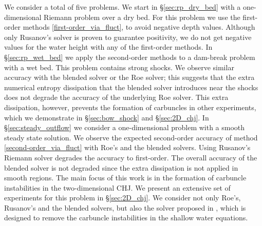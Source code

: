 \documentclass[preprint, 11pt]{article}
\begin{document}
We consider a total of five problems. We start in \S \ref{sec:rp_dry_bed} with a
one-dimensional Riemann problem over a dry bed.
For this problem we use the first-order methods \eqref{first-order_via_fluct},
to avoid negative depth values. Although only Rusanov's solver is proven to guarantee
positivity, we do not get negative values for the water height with any of the first-order methods.
In \S \ref{sec:rp_wet_bed} we apply the second-order methods to a dam-break problem
with a wet bed. This problem contains strong shocks. We observe similar accuracy with the
blended solver or the Roe solver; this suggests that the extra numerical entropy
dissipation that the blended solver introduces near the shocks does not degrade the accuracy
of the underlying Roe solver. This extra dissipation, however, prevents the formation of carbuncles in other experiments,
which we demonstrate in \S \ref{sec:bow_shock} and \S\ref{sec:2D_chj}.
In \S \ref{sec:steady_outflow} we consider a one-dimensional problem with a smooth steady state solution. We observe the expected
second-order accuracy of method \eqref{second-order_via_fluct} with Roe's and the blended solvers. Using
Rusanov's Riemann solver degrades the accuracy to first-order. The overall accuracy of the blended solver
is not degraded since the extra dissipation is not applied in smooth regions.
The main focus of this work is in the formation of carbuncle instabilities in the two-dimensional CHJ. We present
an extensive set of experiments for this problem in \S \ref{sec:2D_chj}.
We consider not only Roe's, Rusanov's and the blended solvers,
but also the solver proposed in \cite{kemm2014note},
which is designed to remove the carbuncle instabilities in the shallow water equations.
\end{document}
